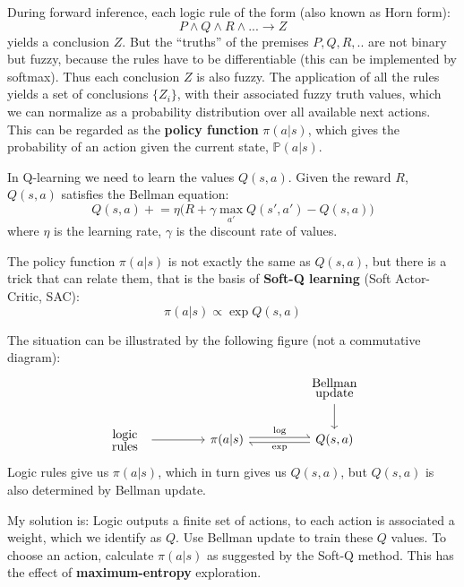 During forward inference, each logic rule of the form (also known as Horn form):
\begin{equation}
	P \wedge Q \wedge R \wedge ... \rightarrow Z
\end{equation}
yields a conclusion $Z$.  But the ``truths'' of the premises $P,Q,R,..$ are not binary but fuzzy, because the rules have to be differentiable (this can be implemented by softmax).  Thus each conclusion $Z$ is also fuzzy.  The application of all the rules yields a set of conclusions $\{ Z_i \}$, with their associated fuzzy truth values, which we can normalize as a probability distribution over all available next actions.  This can be regarded as the \textbf{policy function} $\pi(a|s)$, which gives the probability of an action given the current state, $\mathbb{P}(a|s)$.

In Q-learning we need to learn the values $Q(s,a)$.  Given the reward $R$, $Q(s,a)$ satisfies the Bellman equation:
\begin{equation}
	Q(s,a) \mathrel{+}= \eta \big( R + \gamma \max_{a'} Q(s',a') - Q(s,a) \big)
\end{equation}
where $\eta$ is the learning rate, $\gamma$ is the discount rate of values.

The policy function $\pi(a|s)$ is not exactly the same as $Q(s,a)$, but there is a trick that can relate them, that is the basis of \textbf{Soft-Q learning} (Soft Actor-Critic, SAC):
\begin{equation}
	\pi(a|s) \propto \exp Q(s,a)
\end{equation}

The situation can be illustrated by the following figure (not a commutative diagram):
\begin{equation}
\begin{tikzcd}[column sep=1.5cm, row sep=0.6cm]
	{} & {} & \parbox{1.5cm}{\linespread{-0.5}\selectfont\centering Bellman update} \arrow[d] \\
	\parbox{1.2cm}{\linespread{-0.5}\selectfont\centering logic rules} \arrow[r] 
	& \pi(a|s) \arrow[r,shift left=2pt,harpoon,"\log"]
	& Q(s,a) \arrow[l, shift left=2pt, harpoon, "\exp"] 
\end{tikzcd}
\end{equation}
Logic rules give us $\pi(a|s)$, which in turn gives us $Q(s,a)$, but $Q(s,a)$ is also determined by Bellman update.

My solution is:  Logic outputs a finite set of actions, to each action is associated a weight, which we identify as $Q$.  Use Bellman update to train these $Q$ values.  To choose an action, calculate $\pi(a|s)$ as suggested by the Soft-Q method.  This has the effect of \textbf{maximum-entropy} exploration.

